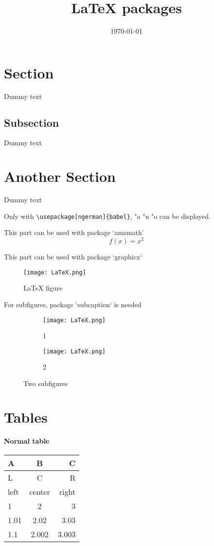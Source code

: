\documentclass{article}
\title{LaTeX packages}
\date{\today}
\begin{document}
\maketitle
\newpage
\doublespacing
\tableofcontents
\singlespacing
\newpage

\section{Section}
Dummy text
\subsection{Subsection}
Dummy text
\section{Another Section}
Dummy text

Only with \verb|\usepackage[ngerman]{babel}|, "a "u "o can be displayed.

This part can be used with package `amsmath'
\begin{equation*}
  f(x) = x^2
\end{equation*}

This part can be used with package `graphicx`
\begin{figure}[h!]
  \texttt{[image: LaTeX.png]}
  \caption{LaTeX figure}
  \label{fig:LaTeX}
\end{figure}

For subfigures, package `subcaption` is needed
\begin{figure}[h!]
  \centering
  \begin{subfigure}[b]{0.4\linewidth}
    \texttt{[image: LaTeX.png]}
    \caption{1}
  \end{subfigure}
  \begin{subfigure}[b]{0.4\linewidth}
    \texttt{[image: LaTeX.png]}
    \caption{2}
  \end{subfigure}
  \caption{Two subfigures}
  \label{fig:LaTeX2}
\end{figure}

\newpage
\section{Tables}
\paragraph{Normal table}
\begin{tabular}{| l | c | r |}
\hline
A & B & C\\
\hline
L & C & R\\
left & center & right\\
\hline
1 & 2 & 3\\
\hline
1.01 & 2.02 & 3.03\\
\hline
1.1 & 2.002 & 3.003\\
\hline
\end{tabular}
\end{document}
